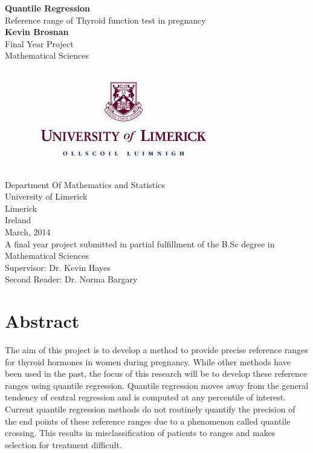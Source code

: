 \documentclass[12pt,a4paper]{report}
\begin{document}
\begin{titlepage}
\vspace*{\fill}
\begin{center}
\Huge{\textbf{Quantile Regression}}\\
\Large{Reference range of Thyroid function test in pregnancy}\\
\vspace{5mm}
\Large{\textbf{Kevin Brosnan}}\\
\vspace{5mm}
\Large{Final Year Project}\\
\Large{Mathematical Sciences}\\
\vspace{5mm}
\begin{figure}[h]
\begin{center}
\includegraphics{ullogo.jpg}
\end{center}
\end{figure}
\Large{Department Of Mathematics and Statistics}\\
\Large{University of Limerick}\\
\Large{Limerick}\\
\Large{Ireland}\\
\Large{March, 2014}\\
\vspace{10mm}
\large{A final year project submitted in partial fulfillment of the B.Sc degree in Mathematical Sciences}\\
\vspace{6mm}
\Large{Supervisor: Dr. Kevin Hayes}\\
\Large{Second Reader: Dr. Norma Bargary}
\end{center}
\vspace*{\fill}
\end{titlepage}


\chapter*{Abstract}
The aim of this project is to develop a method to provide precise reference ranges for thyroid hormones in women during pregnancy. While other methods have been used in the past, the focus of this research will be to develop these reference ranges using quantile regression. Quantile regression moves away from the general tendency of central regression and is computed at any percentile of interest. Current quantile regression methods do not routinely quantify the precision of the end points of these reference ranges due to a phenomenon called quantile crossing. This results in misclassification of patients to ranges and makes selection for treatment difficult.
\vspace{2mm}
\end{document}
